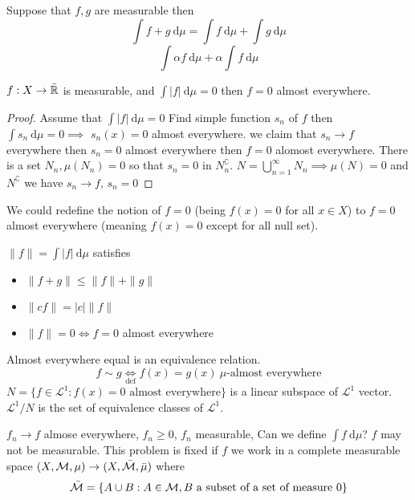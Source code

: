 \begin{claim}
  Suppose that $f, g$ are measurable then
  \[\int f + g\ \mathrm{d}\mu  = \int f\ \mathrm{d}\mu + \int g\ \mathrm{d}\mu\]
  \[\int \alpha f \ \mathrm{d}\mu + \alpha \int f \ \mathrm{d}\mu\]
\end{claim}

\begin{lemma}
  $f: X \to \bar{\mathbb R}$ is measurable, and $\int |f| \ \mathrm{d}\mu = 0$ then $f = 0$ almost everywhere.
\end{lemma}

\begin{proof}
  Assume that $\int |f| \ \mathrm{d}\mu = 0$ Find simple function $s_n$ of $f$ then 
  $\int s_n \ \mathrm{d}\mu = 0 \implies$ $s_n(x) = 0$ almost everywhere.
  we claim that $s_n\to f$ everywhere then $s_n = 0$ almost everywhere then $f = 0$ alomost everywhere.
  There is a set $N_n, \mu(N_n) = 0$ so that $s_n = 0$ in $N_n^\complement$. 
  $N = \bigcup_{n=1}^\infty N_n \implies \mu(N) = 0$ and $N^\complement$ we have $s_n \to f$, $s_n = 0$
\end{proof}

We could redefine the notion of $f=0$ (being $f(x) = 0$ for all $x \in X$) to $f = 0$ almost everywhere (meaning $f(x) = 0$ except for all null set).


\begin{remark}
  $\|f\| = \int |f|\ \mathrm{d}\mu$ satisfies
  \begin{itemize}
    \item $\|f + g\| \le \|f\| + \|g\|$
    \item $\|c f\| = |c|\|f\|$
    \item $\|f\| = 0 \iff f = 0$ almost everywhere
  \end{itemize}
\end{remark}

\begin{remark}
  Almost everywhere equal is an equivalence relation.
  \[f \sim g \underset{\text{def}}\iff f(x) = g(x)\ \mu\text{-almost everywhere}\]
  $N = \{f \in\mathcal{L}^1 : f(x) = 0 \text{ almost everywhere}\}$ is a linear subspace of $\mathcal{L}^1$ vector.
  $\mathcal{L}^1/N$ is the set of equivalence classes of $\mathcal{L}^1$.
\end{remark}

$f_n \to f$ almose everywhere, $f_n \ge 0$, $f_n$ measurable, Can we define $\int f\ \mathrm{d}\mu$?
$f$ may not be measurable. This problem is fixed if $f$ we work in a complete measurable space
$(X, \mathcal M, \mu) \to (X, \bar{\mathcal M}, \bar{\mu})$
where 
\[\bar{\mathcal M} = \{A \cup B : A \in \mathcal M, B \text{ a subset of a set of measure }0\}\]

